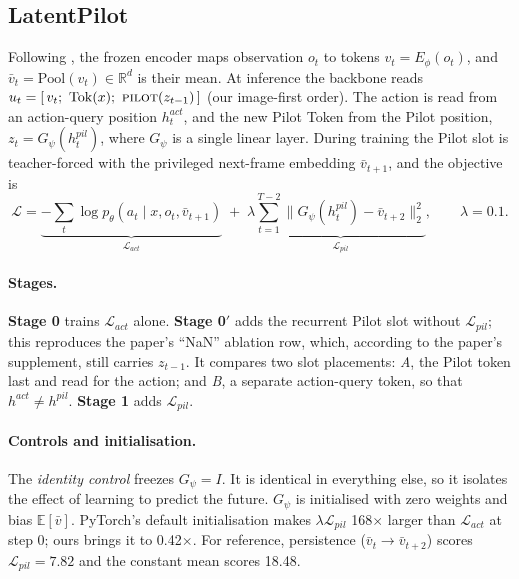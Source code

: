 \documentclass[11pt]{article}
\newcommand{\vbar}{\bar{v}}
\begin{document}
\subsection{LatentPilot}
\label{sec:m-lp}
Following \citet{latentpilot}, the frozen encoder maps observation $o_t$ to tokens $v_t = E_\phi(o_t)$, and
$\vbar_t = \mathrm{Pool}(v_t)\in\mathbb{R}^d$ is their mean. At inference the backbone reads
$u_t = [\,v_t;\ \mathrm{Tok}(x);\ \textsc{pilot}(z_{t-1})\,]$ (our image-first order). The action is read from an
action-query position $h^{act}_t$, and the new Pilot Token from the Pilot position, $z_t = G_\psi(h^{pil}_t)$, where
$G_\psi$ is a single linear layer. During training the Pilot slot is teacher-forced with the privileged next-frame
embedding $\vbar_{t+1}$, and the objective is
\begin{equation}
\mathcal{L} = \underbrace{-\textstyle\sum_{t} \log p_\theta(a_t \mid x, o_t, \vbar_{t+1})}_{\mathcal{L}_{act}}
  \;+\; \lambda \underbrace{\textstyle\sum_{t=1}^{T-2} \big\| G_\psi(h^{pil}_t) - \vbar_{t+2} \big\|_2^2}_{\mathcal{L}_{pil}},
  \qquad \lambda = 0.1 .
\label{eq:lp}
\end{equation}

\paragraph{Stages.}
\textbf{Stage 0} trains $\mathcal{L}_{act}$ alone. \textbf{Stage 0$'$} adds the recurrent Pilot slot without
$\mathcal{L}_{pil}$; this reproduces the paper's ``NaN'' ablation row, which, according to the paper's supplement, still
carries $z_{t-1}$. It compares two slot placements: \emph{A}, the Pilot token last and read for the action; and
\emph{B}, a separate action-query token, so that $h^{act}\neq h^{pil}$. \textbf{Stage 1} adds $\mathcal{L}_{pil}$.

\paragraph{Controls and initialisation.}
The \emph{identity control} freezes $G_\psi = I$. It is identical in everything else, so it isolates the effect of
learning to predict the future. $G_\psi$ is initialised with zero weights and bias $\mathbb{E}[\vbar]$. PyTorch's
default initialisation makes $\lambda\mathcal{L}_{pil}$ 168$\times$ larger than $\mathcal{L}_{act}$ at step 0; ours
brings it to 0.42$\times$. For reference, persistence ($\vbar_t\!\to\!\vbar_{t+2}$) scores $\mathcal{L}_{pil}{=}7.82$
and the constant mean scores 18.48.
\end{document}
